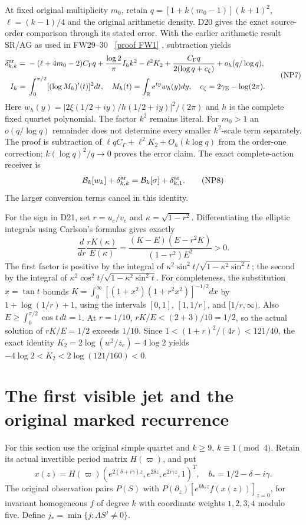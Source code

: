 \documentclass[11pt]{article}
\newcommand{\R}{\mathbb R}
\begin{document}
At fixed original multiplicity $m_0$, retain
$q=[1+k(m_0-1)](k+1)^2$, $\ell=(k-1)/4$ and the original
arithmetic density. D20 gives the exact source-order comparison
through its stated error. With the earlier arithmetic result SR/AG
as used in FW29--30 \cite{FW}%
~\href{https://github.com/KokunoYumeto/zeta-function-research-reader/blob/5992ad50c0f2a06921f1fcaded7b4e38097c0739/workbenches/splitzero-tandem/continuations/20260920-original-kernel-mixed-determinants/providers/FULL_WINDOW_SOURCE_PRODUCTS.tex\#L28}{[proof FW1]}%
{}, subtraction yields
\[
\begin{aligned}
\delta_{k,k}^{\rm ar}={}&-(\ell+4m_0-2)C_\Gamma q
+\frac{\log2}{\pi}I_hk^2-\ell^2K_2
+\frac{C_\Gamma q}{2(\log q+c_\zeta)}+o_h(q/\log q),\\
 I_h={}&\int_0^{\pi/2}[(\log M_h)'(t)]^2dt,
\quad M_h(t)=\int_{\R}e^{ty}w_h(y)dy,
\quad c_\zeta=2\gamma_{\rm E}-\log(2\pi).
\end{aligned}\tag{NP7}
\]
Here $w_h(y)=|2\xi(1/2+iy)/h(1/2+iy)|^2/(2\pi)$ and $h$ is
the complete fixed quartet polynomial. The factor $k^2$ remains
literal. For $m_0>1$ an $o(q/\log q)$ remainder does not determine
every smaller $k^2$-scale term separately. The proof is subtraction of
$\ell qC_\Gamma+\ell^2K_2+O_h(k\log q)$ from the order-one
correction; $k(\log q)^2/q\to0$ proves the error claim. The exact
complete-action receiver is
\[
 \mathcal B_k[w_k]+\delta_{k,k}^{\rm ar}
       =\mathcal B_k[\sigma]+\delta_{k,1}^{\rm ar}. \tag{NP8}
\]
The larger conversion terms cancel in this identity.

For the sign in D21, set $r=u_e/v_e$ and $\kappa=\sqrt{1-r^2}$.
Differentiating the elliptic integrals using Carlson's formulas
\cite[19.4.1--2]{Carlson} gives exactly
\[
 \frac{d}{dr}\frac{rK(\kappa)}{E(\kappa)}
 =\frac{(K-E)(E-r^2K)}{(1-r^2)E^2}>0. \tag{NP9}
\]
The first factor is positive by the integral of
$\kappa^2\sin^2t/\sqrt{1-\kappa^2\sin^2t}$; the second by the
integral of $\kappa^2\cos^2t/\sqrt{1-\kappa^2\sin^2t}$.
For completeness, the substitution $x=\tan t$ bounds
$K=\int_0^\infty[(1+x^2)(1+r^2x^2)]^{-1/2}dx$
by $1+\log(1/r)+1$, using the intervals $[0,1]$, $[1,1/r]$,
and $[1/r,\infty)$. Also $E\ge\int_0^{\pi/2}\cos t\,dt=1$.
At $r=1/10$, $rK/E<(2+3)/10=1/2$, so the actual solution
of $rK/E=1/2$ exceeds $1/10$. Since
$1<(1+r)^2/(4r)<121/40$, the exact identity
$K_2=2\log(w^2/z_e)-4\log2$ yields
$-4\log2<K_2<2\log(121/160)<0$.

\section{The first visible jet and the original marked recurrence}
For this section use the original simple quartet and $k\ge9$,
$k\equiv1\pmod4$. Retain its actual invertible period matrix
$H(\varpi)$, and put
\[
 x(z)=H(\varpi)(e^{2(\delta+i\gamma)z},e^{2\delta z},
 e^{2i\gamma z},1)^T,\quad b_*=1/2-\delta-i\gamma.
 \tag{NP10}
\]
The original observation pairs $P(S)$ with
$P(\partial_z)[e^{kb_*z}f(x(z))]_{z=0}$, for invariant homogeneous
$f$ of degree $k$ with coordinate weights $1,2,3,4$ modulo five.
Define $j_* =\min\{j:\Lambda S^j\ne0\}$.
\end{document}
